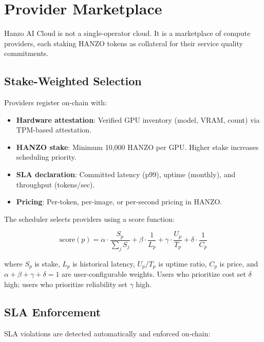 \section{Provider Marketplace}

\label{sec:marketplace}

Hanzo AI Cloud is not a single-operator cloud. It is a marketplace of compute
providers, each staking HANZO tokens as collateral for their service quality
commitments.

\subsection{Stake-Weighted Selection}

Providers register on-chain with:

\begin{itemize}[leftmargin=1.1em]
    \item \textbf{Hardware attestation}: Verified GPU inventory (model, VRAM,
    count) via TPM-based attestation.
    \item \textbf{HANZO stake}: Minimum 10,000 HANZO per GPU. Higher stake
    increases scheduling priority.
    \item \textbf{SLA declaration}: Committed latency (p99), uptime (monthly),
    and throughput (tokens/sec).
    \item \textbf{Pricing}: Per-token, per-image, or per-second pricing in
    HANZO.
\end{itemize}

The scheduler selects providers using a score function:

\begin{equation}
\text{score}(p) = \alpha \cdot \frac{S_p}{\sum_j S_j} +
\beta \cdot \frac{1}{L_p} + \gamma \cdot \frac{U_p}{T_p} +
\delta \cdot \frac{1}{C_p}
\end{equation}

where $S_p$ is stake, $L_p$ is historical latency, $U_p/T_p$ is uptime ratio,
$C_p$ is price, and $\alpha + \beta + \gamma + \delta = 1$ are
user-configurable weights. Users who prioritize cost set $\delta$ high; users
who prioritize reliability set $\gamma$ high.

\subsection{SLA Enforcement}

SLA violations are detected automatically and enforced on-chain:


